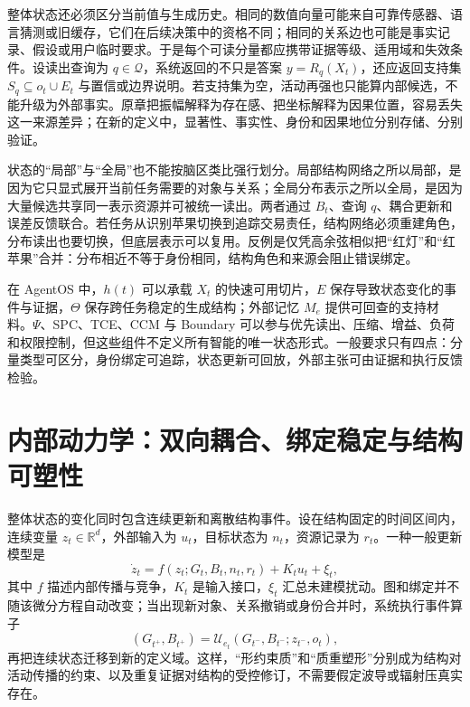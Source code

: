 整体状态还必须区分当前值与生成历史。相同的数值向量可能来自可靠传感器、语言猜测或旧缓存，它们在后续决策中的资格不同；相同的关系边也可能是事实记录、假设或用户临时要求。于是每个可读分量都应携带证据等级、适用域和失效条件。设读出查询为 $q\in\mathcal Q$，系统返回的不只是答案 $y=R_q(X_t)$，还应返回支持集 $S_q\subseteq o_t\cup E_t$ 与置信或边界说明。若支持集为空，活动再强也只能算内部候选，不能升级为外部事实。原章把振幅解释为存在感、把坐标解释为因果位置，容易丢失这一来源差异；在新的定义中，显著性、事实性、身份和因果地位分别存储、分别验证。

状态的“局部”与“全局”也不能按脑区类比强行划分。局部结构网络之所以局部，是因为它只显式展开当前任务需要的对象与关系；全局分布表示之所以全局，是因为大量候选共享同一表示资源并可被统一读出。两者通过 $B_t$、查询 $q$、耦合更新和误差反馈联合。若任务从识别苹果切换到追踪交易责任，结构网络必须重建角色，分布读出也要切换，但底层表示可以复用。反例是仅凭高余弦相似把“红灯”和“红苹果”合并：分布相近不等于身份相同，结构角色和来源会阻止错误绑定。

在 AgentOS 中，$h(t)$ 可以承载 $X_t$ 的快速可用切片，$E$ 保存导致状态变化的事件与证据，$\Theta$ 保存跨任务稳定的生成结构；外部记忆 $M_e$ 提供可回查的支持材料。$\Psi$、SPC、TCE、CCM 与 Boundary 可以参与优先读出、压缩、增益、负荷和权限控制，但这些组件不定义所有智能的唯一状态形式。一般要求只有四点：分量类型可区分，身份绑定可追踪，状态更新可回放，外部主张可由证据和执行反馈检验。

\section{内部动力学：双向耦合、绑定稳定与结构可塑性}
\label{sec:internal_dynamics}

整体状态的变化同时包含连续更新和离散结构事件。设在结构固定的时间区间内，连续变量 $z_t\in\mathbb R^d$，外部输入为 $u_t$，目标状态为 $n_t$，资源记录为 $r_t$。一种一般更新模型是
\begin{equation}
 \dot z_t=f(z_t;G_t,B_t,n_t,r_t)+K_tu_t+\xi_t,
\end{equation}
其中 $f$ 描述内部传播与竞争，$K_t$ 是输入接口，$\xi_t$ 汇总未建模扰动。图和绑定并不随该微分方程自动改变；当出现新对象、关系撤销或身份合并时，系统执行事件算子
\begin{equation}
 (G_{t^+},B_{t^+})=\mathcal U_{e_t}(G_{t^-},B_{t^-};z_{t^-},o_t),
\end{equation}
再把连续状态迁移到新的定义域。这样，“形约束质”和“质重塑形”分别成为结构对活动传播的约束、以及重复证据对结构的受控修订，不需要假定波导或辐射压真实存在。


